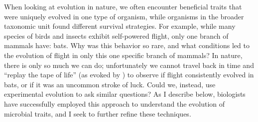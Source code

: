 When looking at evolution in nature, we often encounter beneficial traits that were uniquely evolved in one type of organism, while organisms in the broader taxonomic unit found different survival strategies. %
For example, while many species of birds and insects exhibit self-powered flight, only one branch of mammals have: bats. 
Why was this behavior so rare, and what conditions led to the evolution of flight in only this one specific branch of mammals? 
In nature, there is only so much we can do; unfortunately we cannot travel back in time and ``replay the tape of life'' (as evoked by \citet{gouldWonderfulLifeBurgess1990}) to observe if flight consistently evolved in bats, or if it was an uncommon stroke of luck.
Could we, instead, use experimental evolution to ask similar questions?
As I describe below, biologists have successfully employed this approach to understand the evolution of microbial traits, and I seek to further refine these techniques.

